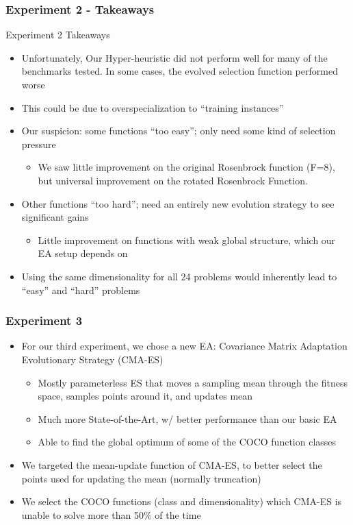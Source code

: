 \documentclass{beamer}
\begin{document}
	\begin{frame}
		\frametitle{Experiment 2 - Takeaways}
		Experiment 2 Takeaways
		\begin{itemize}
			 \item<1-|alert@1> Unfortunately, Our Hyper-heuristic did not perform well for many of the benchmarks tested. In some cases, the evolved selection function performed worse
			 \item<2-|alert@2> This could be due to overspecialization to ``training instances''
			 \item<3-|alert@3> Our suspicion: some functions ``too easy''; only need some kind of selection pressure 
			 \begin{itemize}
			 	\item<4-|alert@4> We saw little improvement on the original Rosenbrock function (F=8), but universal improvement on the rotated Rosenbrock Function.
			 \end{itemize}
			 \item<5-|alert@5> Other functions ``too hard''; need an entirely new evolution strategy to see significant gains
			 \begin{itemize}
			 	\item<6-|alert@6> Little improvement on functions with weak global structure, which our EA setup depends on
			 \end{itemize}			 
			 \item<7-|alert@7> Using the same dimensionality for all 24 problems would inherently lead to ``easy'' and ``hard'' problems			 
		\end{itemize}
	\end{frame} 	
 

	\begin{frame}
		\frametitle{Experiment 3}
		
		\begin{itemize}
			 \item<1-|alert@1> For our third experiment, we chose a new EA: Covariance Matrix Adaptation Evolutionary Strategy (CMA-ES)
			 \begin{itemize}
			 	\item<2-|alert@2> Mostly parameterless ES that moves a sampling mean through the fitness space, samples points around it, and updates mean
			 	\item<3-|alert@3> Much more State-of-the-Art, w/ better performance than our basic EA
			 	\item<4-|alert@4> Able to find the global optimum of some of the COCO function classes
			 \end{itemize}
			 \item<5-|alert@5> We targeted the mean-update function of CMA-ES, to better select the points used for updating the mean (normally truncation)
			 \item<6-|alert@6> We select the COCO functions (class and dimensionality) which CMA-ES is unable to solve more than 50\% of the time
		\end{itemize}
	\end{frame}  
 
\end{document}
